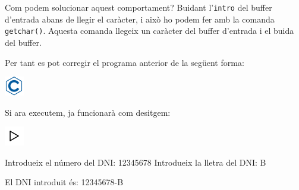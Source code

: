 \documentclass[]{book}
\newenvironment{Shaded}{\begin{snugshade}}{\end{snugshade}}
\newcommand{\DataTypeTok}[1]{\textcolor[rgb]{0.13,0.29,0.53}{#1}}
\newcommand{\DecValTok}[1]{\textcolor[rgb]{0.00,0.00,0.81}{#1}}
\newcommand{\SpecialCharTok}[1]{\textcolor[rgb]{0.00,0.00,0.00}{#1}}
\newcommand{\StringTok}[1]{\textcolor[rgb]{0.31,0.60,0.02}{#1}}
\newcommand{\ImportTok}[1]{#1}
\newcommand{\CommentTok}[1]{\textcolor[rgb]{0.56,0.35,0.01}{\textit{#1}}}
\newcommand{\ControlFlowTok}[1]{\textcolor[rgb]{0.13,0.29,0.53}{\textbf{#1}}}
\newcommand{\PreprocessorTok}[1]{\textcolor[rgb]{0.56,0.35,0.01}{\textit{#1}}}
\newcommand{\NormalTok}[1]{#1}
\begin{document}
Com podem solucionar aquest comportament? Buidant l'\texttt{intro} del
buffer d'entrada abans de llegir el caràcter, i això ho podem fer amb la
comanda \texttt{getchar()}. Aquesta comanda llegeix un caràcter del
buffer d'entrada i el buida del buffer.

Per tant es pot corregir el programa anterior de la següent forma:

\includegraphics{./img/c.png}

\begin{Shaded}
\end{Shaded}

Si ara executem, ja funcionarà com desitgem:

\includegraphics{./img/play.png}

\begin{Shaded}
\begin{Highlighting}[]
\NormalTok{Introdueix el número del DNI: }\DecValTok{12345678}
\NormalTok{Introdueix la lletra del DNI: B}

\NormalTok{El DNI introduit és: }\DecValTok{12345678}\NormalTok{-B}
\end{Highlighting}
\end{Shaded}
\end{document}
